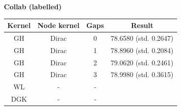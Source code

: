 \documentclass{article}
\begin{document}
\textbf{Collab (labelled)}\\
\begin{minipage}{0.6\linewidth}
	\hspace*{-1in}

	\label{fig:collab}
\end{minipage}
\begin{minipage}[c]{0.5\linewidth}
	
	\centering
	\begin{tabular}{c|c|c|c}
		Kernel & Node kernel & Gaps & Result\\
		\hline
		GH & Dirac & 0 & 78.6580 (std. 0.2647)\\
		GH & Dirac & 1 & 78.8960 (std. 0.2084)\\
		GH & Dirac & 2 & 79.0620 (std. 0.2461)\\
		GH & Dirac & 3 & 78.9980 (std. 0.3615)\\
		WL & - & - & \\
		DGK & - & - & \\
	\end{tabular}
	\label{table:collab}
\end{minipage}
\end{document}
